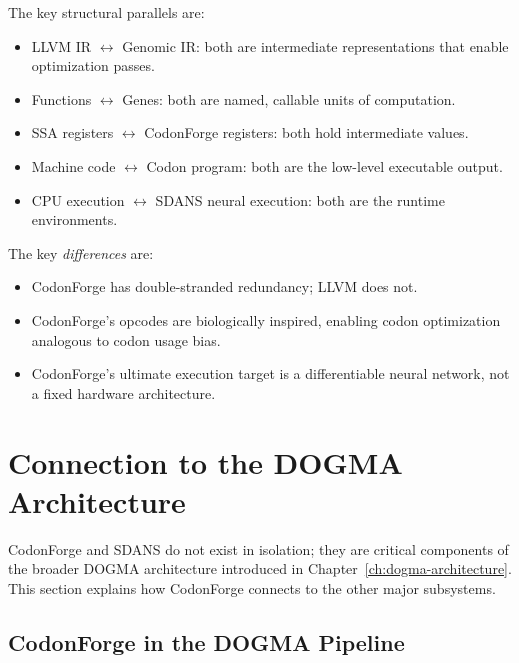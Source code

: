 \begin{dogmadef}
The key structural parallels are:
\begin{itemize}[leftmargin=1.5em]
  \item LLVM IR $\leftrightarrow$ Genomic IR: both are intermediate representations that enable optimization passes.
  \item Functions $\leftrightarrow$ Genes: both are named, callable units of computation.
  \item SSA registers $\leftrightarrow$ CodonForge registers: both hold intermediate values.
  \item Machine code $\leftrightarrow$ Codon program: both are the low-level executable output.
  \item CPU execution $\leftrightarrow$ SDANS neural execution: both are the runtime environments.
\end{itemize}

The key \emph{differences} are:
\begin{itemize}[leftmargin=1.5em]
  \item CodonForge has double-stranded redundancy; LLVM does not.
  \item CodonForge's opcodes are biologically inspired, enabling codon optimization analogous to codon usage bias.
  \item CodonForge's ultimate execution target is a differentiable neural network, not a fixed hardware architecture.
\end{itemize}
\end{dogmadef}


\section{Connection to the DOGMA Architecture}
\label{sec:dogma-connection}

CodonForge and SDANS do not exist in isolation; they are critical components of the broader DOGMA architecture introduced in Chapter~\ref{ch:dogma-architecture}. This section explains how CodonForge connects to the other major subsystems.

\subsection{CodonForge in the DOGMA Pipeline}

